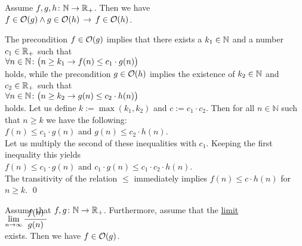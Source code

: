\begin{Proposition} 
Assume $f,g,h \colon {\mathbb N} \rightarrow {{\mathbb R}_+}$. Then we have \\[0.2cm]
\hspace*{1.3cm}
 $f \in \mathcal{O}(g) \wedge g \in \mathcal{O}(h) \,\rightarrow\, f \in \mathcal{O}(h)$.

\end{Proposition}

\proof
The precondition $f \in \mathcal{O}(g)$ implies that there exists a $k_1 \in {\mathbb N}$ and a number $c_1 \in {\mathbb R}_+$
such that 
\\[0.2cm]
\hspace*{1.3cm} 
$\forall n \in {\mathbb N} \colon\bigl( n \geq k_1 \rightarrow f(n) \leq c_1 \cdot g(n)\bigr)$ 
\\[0.2cm]
holds, while the precondition $g \in \mathcal{O}(h)$ implies the existence of $k_2 \in {\mathbb N}$ and $c_2 \in {\mathbb R}_+$
such that \\[0.2cm]
\hspace*{1.3cm} 
$\forall n \in {\mathbb N} \colon\bigl( n \geq k_2 \rightarrow g(n) \leq c_2 \cdot h(n)\bigr)$ 
\\[0.2cm]
holds.  Let us define $k:= \max(k_1,k_2)$ and $c := c_1 \cdot c_2$.  Then for all $n \in \mathbb{N}$
such that $n \geq k$ we have the following:
\\[0.2cm]
\hspace*{1.3cm}
$f(n) \leq c_1\cdot g(n)$ \quad and \quad $g(n) \leq c_2 \cdot h(n)$. 
\\[0.2cm]
Let us multiply the second of these inequalities with $c_1$.  Keeping the first inequality this yields
\\[0.2cm]
\hspace*{1.3cm}
$f(n) \leq c_1\cdot g(n)$  \quad and \quad $c_1\cdot g(n) \leq c_1\cdot c_2 \cdot h(n)$. 
\\[0.2cm]
The transitivity of the relation $\leq$ immediately implies $f(n) \leq c \cdot h(n)$ for $n \geq k$.  
\qed

\begin{Proposition}  \label{limit}
  Assume that $f,g \colon {\mathbb N} \rightarrow {{\mathbb R}_+}$.   Furthermore, assume that the
  \href{https://en.wikipedia.org/wiki/Limit_of_a_sequence}{limit} 
  \\[0.4cm]
  \hspace*{1.3cm}
 $\lim\limits_{n \rightarrow \infty} \bruch{\,f(n)\,}{g(n)}$
  \\[0.2cm]
  exists.  Then we have $f \in \mathcal{O}(g)$. 
\end{Proposition}

